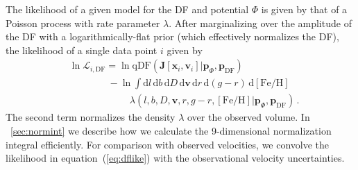 \documentclass{emulateapj}
\newcommand{\dd}{\mathrm{d}}
\newcommand{\eqnname}{equation}
\newcommand{\feh}{\ensuremath{[\mathrm{Fe/H}]}}
\renewcommand{\vec}[1]{\ensuremath{\mathbf{#1}}}
\newcommand{\vecx}{\ensuremath{\vec{x}}}
\newcommand{\vecv}{\ensuremath{\vec{v}}}
\newcommand{\vecj}{\ensuremath{\vec{J}}}
\newcommand{\qdf}{\ensuremath{\mathrm{qDF}}}
\newcommand{\paramsdf}{\ensuremath{\vec{p}_{\mathrm{DF}}}}
\newcommand{\paramspot}{\ensuremath{\vec{p}_\Phi}}
\begin{document}
The likelihood of a given model for the DF and potential $\Phi$ is
given by that of a Poisson process with rate parameter
$\lambda$. After marginalizing over the amplitude of the DF with a
logarithmically-flat prior (which effectively normalizes the DF), the
likelihood of a single data point $i$ given by
\begin{equation}\label{eq:dflike}
\begin{split}
  & \ln \mathcal{L}_{i,\mathrm{DF}} = \ln
    \qdf(\vecj[\vecx_i,\vecv_i]|\paramspot,\paramsdf) \\
    & \qquad \qquad -\ln \int \dd l
    \,\dd b\, \dd D\, \dd \vecv\,\dd r\, \dd (g-r) \,\dd\feh\\
    & \qquad \qquad \qquad \ \lambda(l,b,D,\vecv,r,g-r,\feh|\paramspot,\paramsdf)\,.
\end{split}
\end{equation}
The second term normalizes the density $\lambda$ over the observed
volume. In \appendixname~\ref{sec:normint} we describe how we
calculate the 9-dimensional normalization integral efficiently. For
comparison with observed velocities, we convolve the likelihood in
\eqnname~(\ref{eq:dflike}) with the observational velocity
uncertainties.
\end{document}

